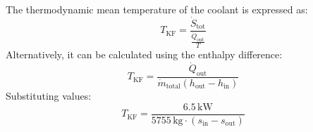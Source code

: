The thermodynamic mean temperature of the coolant is expressed as:  
\[
T_{\text{KF}} = \frac{\dot{S}_{\text{tot}}}{\frac{\dot{Q}_{\text{out}}}{T}}
\]  
Alternatively, it can be calculated using the enthalpy difference:  
\[
T_{\text{KF}} = \frac{\dot{Q}_{\text{out}}}{\dot{m}_{\text{total}} (h_{\text{out}} - h_{\text{in}})}
\]  
Substituting values:  
\[
T_{\text{KF}} = \frac{6.5 \, \text{kW}}{5755 \, \text{kg} \cdot (s_{\text{in}} - s_{\text{out}})}
\]